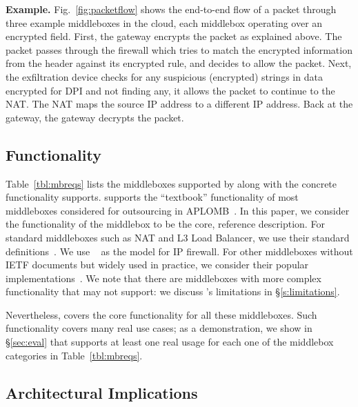 {\bf Example.} Fig.~\ref{fig:packetflow} shows the end-to-end flow of a packet through three example middleboxes in the cloud, each middlebox operating over an encrypted field.  
First,  the gateway encrypts the packet as explained above. The packet passes through the firewall which tries to match the encrypted information from the header against its encrypted rule, and decides to allow the packet. Next, the exfiltration device checks for any suspicious (encrypted) strings in data encrypted for DPI and not finding any, it allows the packet to continue to the NAT. The NAT maps the source IP address to a different IP address. Back at the gateway, the gateway decrypts the packet. 

\subsection{Functionality}


Table~\ref{tbl:mbreqs} lists the middleboxes supported by \sys along with the concrete functionality \sys supports.
\sys supports the ``textbook'' functionality of most middleboxes considered for outsourcing in APLOMB~\cite{aplomb}.
In this paper, we consider the functionality of the middlebox to be the core, reference description.
For standard middleboxes such as NAT and L3 Load Balancer, we use their standard definitions~\cite{rfc3022, rfc2991}.
We use ~\cite{fireman} as the model for IP firewall. For other middleboxes without IETF documents
but widely used in practice, we consider their popular implementations~\cite{haproxy, squid, bro, snort}.
We note that there are middleboxes with more complex functionality 
that \sys may not support: we discuss \sys's limitations in \S\ref{s:limitations}.

Nevertheless, \sys covers the core functionality for all these middleboxes. 
Such functionality covers many real use cases; as a demonstration, 
we show in \S\ref{sec:eval} that \sys supports at least one real usage 
for each one of the middlebox categories in Table~\ref{tbl:mbreqs}.




\subsection{Architectural Implications} 
\label{sec:bbarch}

